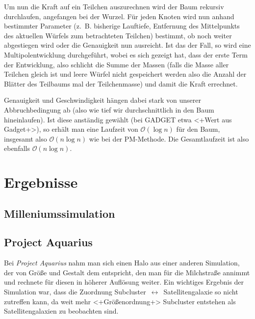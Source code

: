 \documentclass[a4paper]{scrartcl}
\begin{document}
Um nun die Kraft auf ein Teilchen auszurechnen wird der Baum rekursiv
durchlaufen, angefangen bei der Wurzel. Für jeden Knoten wird nun anhand
bestimmter Parameter (z.~B. bisherige Lauftiefe, Entfernung des Mittelpunkts des
aktuellen Würfels zum betrachteten Teilchen) bestimmt, ob noch weiter
abgestiegen wird oder die Genauigkeit nun ausreicht. Ist das der Fall, so wird
eine Multipolentwicklung durchgeführt, wobei es sich gezeigt hat, dass der erste
Term der Entwicklung, also schlicht die Summe der Massen (falls die Masse aller
Teilchen gleich ist und leere Würfel nicht gespeichert werden also die Anzahl
der Blätter des Teilbaums mal der Teilchenmasse) und damit die Kraft errechnet.

Genauigkeit und Geschwindigkeit hängen dabei stark von unserer Abbruchbedingung
ab (also wie tief wir durchschnittlich in den Baum hineinlaufen). Ist diese
anständig gewählt (bei GADGET etwa <+Wert aus Gadget+>\cite{gadget-abbruch}), so
erhält man eine Laufzeit von $\mathcal{O}(\log n)$ für den Baum, insgesamt also
$\mathcal O(n\log n)$ wie bei der PM-Methode. Die Gesamtlaufzeit ist also
ebenfalls $\mathcal O(n\log n)$.

\section{Ergebnisse}
\subsection{Milleniumssimulation}

\subsection{Project Aquarius}
Bei \emph{Project Aquarius} nahm man sich einen Halo aus einer anderen
Simulation, der von Größe und Gestalt dem entspricht, den man für die
Milchstraße annimmt und rechnete für diesen in höherer Auflösung weiter. Ein
wichtiges Ergebnis der Simulation war, dass die Zuordnung
Subcluster~$\leftrightarrow$~Satellitengalaxie so nicht zutreffen kann, da weit
mehr <+Größenordnung+> Subcluster entstehen als Satellitengalaxien zu beobachten
sind.

\end{document}
